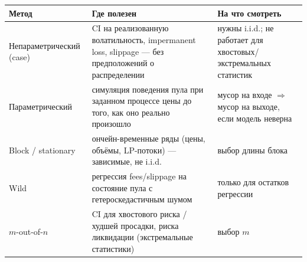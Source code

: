 \documentclass[11pt]{article}
\begin{document}
\begin{center}
\begin{tabular}{@{}p{3.4cm}p{5.6cm}p{5.4cm}@{}}
\toprule
\textbf{Метод} & \textbf{Где полезен} & \textbf{На что смотреть} \\
\midrule
Непараметрический (case) & CI на реализованную волатильность, impermanent loss, slippage --- без предположений о распределении & нужны i.i.d.; не работает для хвостовых/экстремальных статистик \\
Параметрический & симуляция поведения пула при заданном процессе цены до того, как оно реально произошло & мусор на входе $\Rightarrow$ мусор на выходе, если модель неверна \\
Block / stationary & ончейн-временные ряды (цены, объёмы, LP-потоки) --- зависимые, не i.i.d.\ & выбор длины блока \\
Wild & регрессия fees/slippage на состояние пула с гетероскедастичным шумом & только для остатков регрессии \\
$m$-out-of-$n$ & CI для хвостового риска / худшей просадки, риска ликвидации (экстремальные статистики) & выбор $m$ \\
\bottomrule
\end{tabular}
\end{center}
\end{document}
